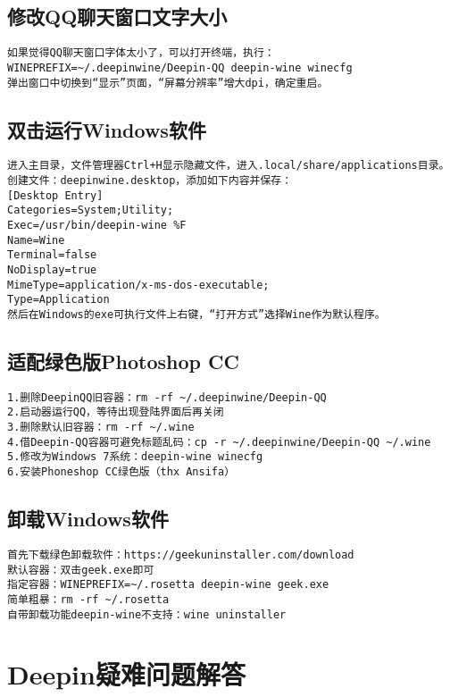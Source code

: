 \documentclass[a4paper,fontset=fandol,zihao=-4,linespread=1.2,oneside]{ctexbook}
\begin{document}
\section{修改QQ聊天窗口文字大小}
\begin{lstlisting}
如果觉得QQ聊天窗口字体太小了，可以打开终端，执行：
WINEPREFIX=~/.deepinwine/Deepin-QQ deepin-wine winecfg
弹出窗口中切换到“显示”页面，“屏幕分辨率”增大dpi，确定重启。
\end{lstlisting}

\section{双击运行Windows软件}
\begin{lstlisting}
进入主目录，文件管理器Ctrl+H显示隐藏文件，进入.local/share/applications目录。
创建文件：deepinwine.desktop，添加如下内容并保存：
[Desktop Entry]
Categories=System;Utility;
Exec=/usr/bin/deepin-wine %F
Name=Wine
Terminal=false
NoDisplay=true
MimeType=application/x-ms-dos-executable;
Type=Application
然后在Windows的exe可执行文件上右键，“打开方式”选择Wine作为默认程序。
\end{lstlisting}

\section{适配绿色版Photoshop CC}
\begin{lstlisting}
1.删除DeepinQQ旧容器：rm -rf ~/.deepinwine/Deepin-QQ
2.启动器运行QQ，等待出现登陆界面后再关闭
3.删除默认旧容器：rm -rf ~/.wine
4.借Deepin-QQ容器可避免标题乱码：cp -r ~/.deepinwine/Deepin-QQ ~/.wine
5.修改为Windows 7系统：deepin-wine winecfg
6.安装Phoneshop CC绿色版（thx Ansifa）
\end{lstlisting}

\section{卸载Windows软件}
\begin{lstlisting}
首先下载绿色卸载软件：https://geekuninstaller.com/download
默认容器：双击geek.exe即可
指定容器：WINEPREFIX=~/.rosetta deepin-wine geek.exe
简单粗暴：rm -rf ~/.rosetta
自带卸载功能deepin-wine不支持：wine uninstaller
\end{lstlisting}


\chapter{Deepin疑难问题解答}
\end{document}
